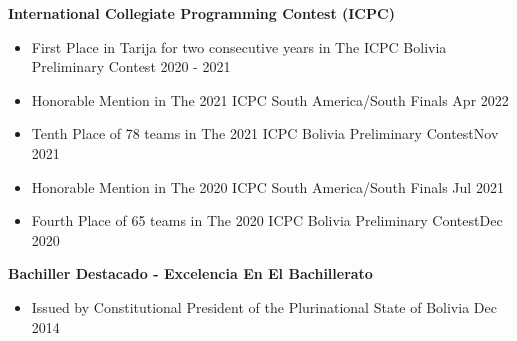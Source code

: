 {\textbf{International Collegiate Programming Contest (ICPC)}}\par
\begin{itemize}
    \item First Place in Tarija for two consecutive years in The ICPC Bolivia Preliminary Contest \hfill 2020 - 2021 
    \item Honorable Mention in The 2021 ICPC South America/South Finals \hfill Apr 2022 
	\item Tenth Place of 78 teams in The 2021 ICPC Bolivia Preliminary Contest\hfill Nov 2021 
	\item Honorable Mention in The 2020 ICPC South America/South Finals \hfill Jul 2021
	\item Fourth Place of 65 teams in The 2020 ICPC Bolivia Preliminary Contest\hfill Dec 2020 
\end{itemize}\vspace{0.1cm} \par

{\textbf{Bachiller Destacado - Excelencia En El Bachillerato}}\par
\begin{itemize}
    \item Issued by Constitutional President of the Plurinational State of Bolivia \hfill Dec 2014
\end{itemize}\vspace{0.1cm} \par